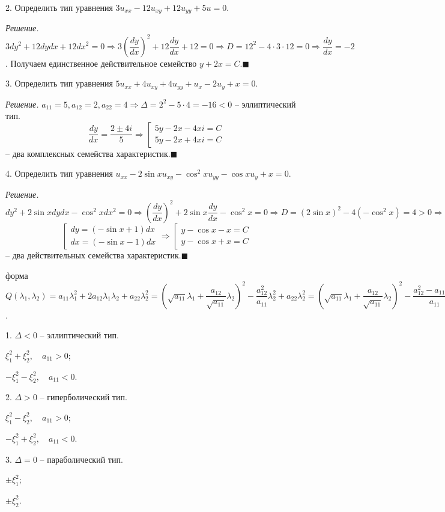 \documentclass[9pt]{article}
\begin{document}
\par2. Определить тип уравнения \(3u_{xx}-12u_{xy}+12u_{yy}+5u=0\).
\par\textit{Решение.} \(3dy^2+12dydx+12dx^2=0\Rightarrow 3(\dfrac{dy}{dx})^2+12\dfrac{dy}{dx}+12=0\Rightarrow D = 12^2-4\cdot3\cdot12=0\Rightarrow\dfrac{dy}{dx}=-2\). Получаем единственное действительное семейство \(y+2x=C\).\(\blacksquare\)
\par3. Определить тип уравнения \(5u_{xx}+4u_{xy}+4u_{yy}+u_x-2u_y+x=0\).
\par\textit{Решение.} \(a_{11}=5,a_{12}=2,a_{22}=4\Rightarrow\Delta=2^2-5\cdot4=-16<0\) -- эллиптический тип.
\[\dfrac{dy}{dx}=\dfrac{2\pm4i}{5}\Rightarrow\left[
\begin{array}{l}
    5y-2x-4xi=C \\
    5y-2x+4xi=C
\end{array}\right.\] -- два комплексных семейства характеристик.\(\blacksquare\)
\par4. Определить тип уравнения \(u_{xx}-2\sin xu_{xy}-\cos^2xu_{yy}-\cos xu_y+x=0\).
\par\textit{Решение.} \(dy^2+2\sin xdydx-\cos^2xdx^2=0 \Rightarrow (\dfrac{dy}{dx})^2+2\sin x\dfrac{dy}{dx}-\cos^2x=0\Rightarrow D=(2\sin x)^2-4(-\cos^2x)=4>0\Rightarrow \dfrac{dy}{dx}=-\sin x+-1\)
\[\left[
\begin{array}{l}
    dy=(-\sin x+1)dx\\
    dx=(-\sin x-1)dx
\end{array}
\right.\Rightarrow\left[
\begin{array}{l}
    y-\cos x-x=C\\
    y-\cos x+x=C
\end{array}
\right.\]
-- два действительных семейства характеристик.\(\blacksquare\)

 форма \(Q(\lambda_1,\lambda_2)=a_{11}\lambda_1^2+2a_{12}\lambda_1\lambda_2+a_{22}\lambda_2^2=(\sqrt{a_{11}}\lambda_1+\dfrac{a_{12}}{\sqrt{a_{11}}}\lambda_2)^2-\dfrac{a_{12}^2}{a_{11}}\lambda_2^2+a_{22}\lambda_2^2=(\sqrt{a_{11}}\lambda_1+\dfrac{a_{12}}{\sqrt{a_{11}}}\lambda_2)^2-\dfrac{a_{12}^2-a_{11}a_{22}}{a_{11}}\cdot\lambda^2_2\).
\par1. \(\Delta < 0\) -- эллиптический тип.
\par\(\xi_1^2+\xi_2^2,\quad a_{11}>0\);
\par\(-\xi_1^2-\xi_2^2,\quad a_{11}<0\).
\par2. \(\Delta > 0\) -- гиперболический тип.
\par\(\xi_1^2-\xi_2^2,\quad a_{11}>0\);
\par\(-\xi_1^2+\xi_2^2,\quad a_{11}<0\).
\par3. \(\Delta = 0\) -- параболический тип.
\par\(\pm\xi_1^2\);
\par\(\pm\xi_2^2\).
\end{document}
